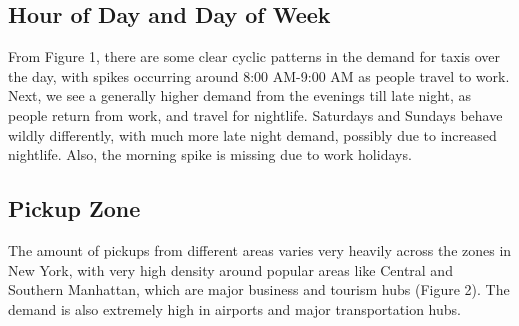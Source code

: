 \documentclass[11pt]{article}
\begin{document}
\subsection{Hour of Day and Day of Week}
From Figure 1, there are some clear cyclic patterns in the demand for taxis over the day, with spikes occurring around 8:00 AM-9:00 AM as people travel to work. Next, we see a generally higher demand from the evenings till late night, as people return from work, and travel for nightlife. Saturdays and Sundays behave wildly differently, with much more late night demand, possibly due to increased nightlife. Also, the morning spike is missing due to work holidays.
\begin{figure}[H]
\begin{floatrow}

\end{floatrow}
\end{figure}

\subsection{Pickup Zone}
The amount of pickups from different areas varies very heavily across the zones in New York, with very high density around popular areas like Central and Southern Manhattan, which are major business and tourism hubs (Figure 2). The demand is also extremely high in airports and major transportation hubs.
\end{document}
